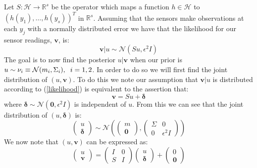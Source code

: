 \documentclass{article}
\theoremstyle{definition}
\theoremstyle{remark}
\begin{document}
Let $S:\mathcal{H}\rightarrow\mathbb{R}^{s}$ be the operator which maps a function $h\in\mathcal{H}$ to $(h(y_1),\dots,h(y_s))^{T}$ in $\mathbb{R}^{s}$. Assuming that the sensors make observations at each $y_j$ with a normally distributed error we have that the likelihood for our sensor readings, $\mathbf{v}$, is:
\begin{equation}
  \label{likelihood}
  \mathbf{v}|u \sim \mathcal{N}(Su,\epsilon^{2}I)
\end{equation}
The goal is to now find the posterior $u|\mathbf{v}$ when our prior is $u\sim\nu_{i}\equiv\mathcal{N}(m_{i},\Sigma_{i}), \hspace{0.2cm} i=1,2$. In order to do so we will first find the joint distribution of $(u,\mathbf{v})$. To do this we note our assumption that $\mathbf{v}|u$ is distributed according to (\ref{likelihood}) is equivalent to the assertion that:
\begin{equation*}
  \mathbf{v}=Su+\boldsymbol{\delta}
\end{equation*}
where $\boldsymbol{\delta}\sim\mathcal{N}(\mathbf{0},\epsilon^{2}I)$ is independent of $u$. From this we can see that the joint distribution of $(u,\boldsymbol{\delta})$ is:
\begin{equation*}
  \begin{pmatrix}
    u \\
    \boldsymbol{\delta}
  \end{pmatrix}\sim\mathcal{N}\left(\begin{pmatrix}
                                    m \\
                                    \mathbf{0}
                                    \end{pmatrix},
                                    \begin{pmatrix}
                                      \Sigma & 0 \\
                                      0 & \epsilon^{2}I
                                    \end{pmatrix}
                              \right)
\end{equation*}
We now note that $(u,\mathbf{v})$ can be expressed as:
\begin{equation*}
  \begin{pmatrix}
    u \\
    \mathbf{v}
  \end{pmatrix}=\begin{pmatrix}
                  I & 0 \\
                  S & I
                \end{pmatrix}\begin{pmatrix}
                              u \\
                              \boldsymbol{\delta}
                             \end{pmatrix} +
                             \begin{pmatrix}
                                0 \\ \mathbf{0}
                             \end{pmatrix}
\end{equation*}
\end{document}
